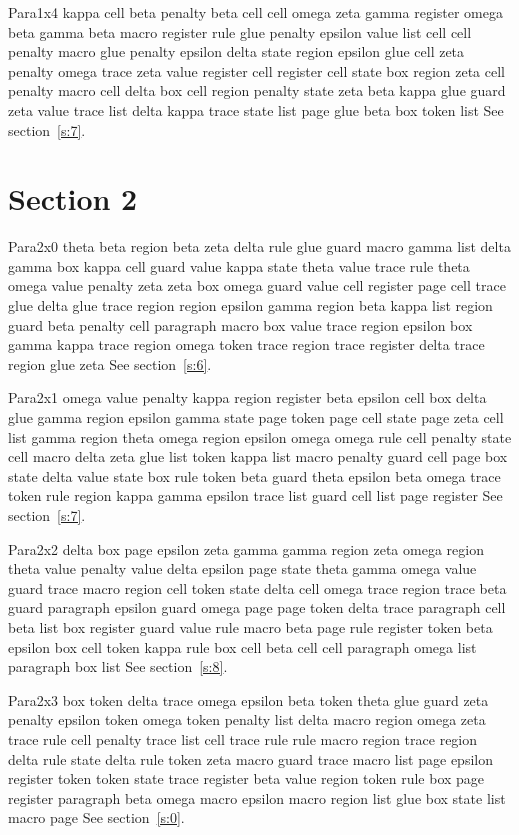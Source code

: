 \documentclass{article}
\begin{document}
Para1x4 kappa cell beta penalty beta cell cell omega zeta gamma register omega beta gamma beta macro register rule glue penalty epsilon value list cell cell penalty macro glue penalty epsilon delta state region epsilon glue cell zeta penalty omega trace zeta value register cell register cell state box region zeta cell penalty macro cell delta box cell region penalty state zeta beta kappa glue guard zeta value trace list delta kappa trace state list page glue beta box token list See section~\ref{s:7}.

\section{Section 2}\label{s:2}
Para2x0 theta beta region beta zeta delta rule glue guard macro gamma list delta gamma box kappa cell guard value kappa state theta value trace rule theta omega value penalty zeta zeta box omega guard value cell register page cell trace glue delta glue trace region region epsilon gamma region beta kappa list region guard beta penalty cell paragraph macro box value trace region epsilon box gamma kappa trace region omega token trace region trace register delta trace region glue zeta See section~\ref{s:6}.

Para2x1 omega value penalty kappa region register beta epsilon cell box delta glue gamma region epsilon gamma state page token page cell state page zeta cell list gamma region theta omega region epsilon omega omega rule cell penalty state cell macro delta zeta glue list token kappa list macro penalty guard cell page box state delta value state box rule token beta guard theta epsilon beta omega trace token rule region kappa gamma epsilon trace list guard cell list page register See section~\ref{s:7}.

Para2x2 delta box page epsilon zeta gamma gamma region zeta omega region theta value penalty value delta epsilon page state theta gamma omega value guard trace macro region cell token state delta cell omega trace region trace beta guard paragraph epsilon guard omega page page token delta trace paragraph cell beta list box register guard value rule macro beta page rule register token beta epsilon box cell token kappa rule box cell beta cell cell paragraph omega list paragraph box list See section~\ref{s:8}.

Para2x3 box token delta trace omega epsilon beta token theta glue guard zeta penalty epsilon token omega token penalty list delta macro region omega zeta trace rule cell penalty trace list cell trace rule rule macro region trace region delta rule state delta rule token zeta macro guard trace macro list page epsilon register token token state trace register beta value region token rule box page register paragraph beta omega macro epsilon macro region list glue box state list macro page See section~\ref{s:0}.
\end{document}
